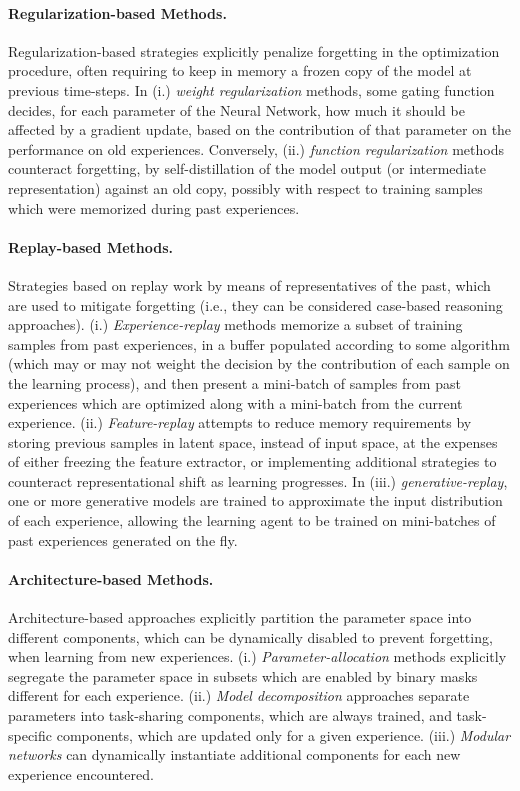 \paragraph{Regularization-based Methods.} Regularization-based strategies explicitly penalize forgetting in the optimization procedure, often requiring to keep in memory a frozen copy of the model at previous time-steps. In (i.) \textit{weight regularization} methods, some gating function decides, for each parameter of the Neural Network, how much it should be affected by a gradient update, based on the contribution of that parameter on the performance on old experiences. Conversely, (ii.) \textit{function regularization} methods counteract forgetting, by self-distillation of the model output (or intermediate representation) against an old copy, possibly with respect to training samples which were memorized during past experiences.

\paragraph{Replay-based Methods.} Strategies based on replay work by means of representatives of the past, which are used to mitigate forgetting (i.e., they can be considered case-based reasoning approaches). (i.) \textit{Experience-replay} methods memorize a subset of training samples from past experiences, in a buffer populated according to some algorithm (which may or may not weight the decision by the contribution of each sample on the learning process), and then present a mini-batch of samples from past experiences which are optimized along with a mini-batch from the current experience. (ii.) \textit{Feature-replay} attempts to reduce memory requirements by storing previous samples in latent space, instead of input space, at the expenses of either freezing the feature extractor, or implementing additional strategies to counteract representational shift as learning progresses. In (iii.) \textit{generative-replay}, one or more generative models are trained to approximate the input distribution of each experience, allowing the learning agent to be trained on mini-batches of past experiences generated on the fly. 

\paragraph{Architecture-based Methods.} Architecture-based approaches explicitly partition the parameter space into different components, which can be dynamically disabled to prevent forgetting, when learning from new experiences. (i.) \textit{Parameter-allocation} methods explicitly segregate the parameter space in subsets which are enabled by binary masks different for each experience. (ii.) \textit{Model decomposition} approaches separate parameters into task-sharing components, which are always trained, and task-specific components, which are updated only for a given experience. (iii.) \textit{Modular networks} can dynamically instantiate additional components for each new experience encountered.

